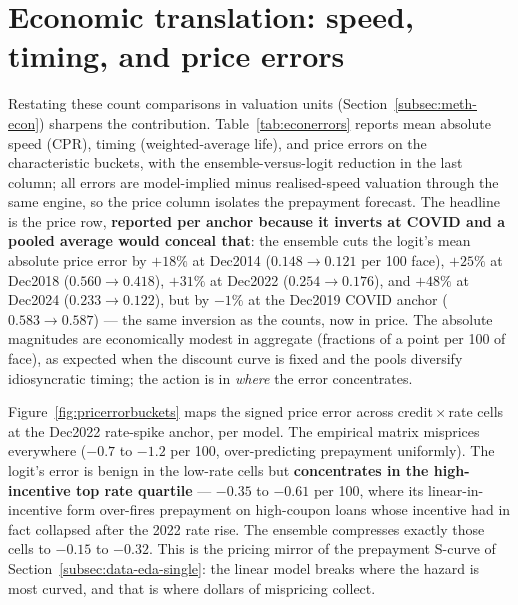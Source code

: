 \section{Economic translation: speed, timing, and price errors}

Restating these count comparisons in valuation units
(Section~\ref{subsec:meth-econ}) sharpens the contribution.
Table~\ref{tab:econerrors} reports mean absolute speed (CPR), timing
(weighted-average life), and price errors on the characteristic
buckets, with the ensemble-versus-logit reduction in the last column;
all errors are model-implied minus realised-speed valuation through the
same engine, so the price column isolates the prepayment forecast.  The
headline is the price row, \textbf{reported per anchor because it
inverts at COVID and a pooled average would conceal that}: the ensemble
cuts the logit's mean absolute price error by $+18\%$ at Dec2014
($0.148\to0.121$ per 100 face), $+25\%$ at Dec2018
($0.560\to0.418$), $+31\%$ at Dec2022 ($0.254\to0.176$), and $+48\%$ at
Dec2024 ($0.233\to0.122$), but by $-1\%$ at the Dec2019 COVID anchor
($0.583\to0.587$) --- the same inversion as the counts, now in price.
The absolute magnitudes are economically modest in aggregate (fractions
of a point per 100 of face), as expected when the discount curve is
fixed and the pools diversify idiosyncratic timing; the action is in
\emph{where} the error concentrates.

Figure~\ref{fig:pricerrorbuckets} maps the signed price error across
credit\,$\times$\,rate cells at the Dec2022 rate-spike anchor, per
model.  The empirical matrix misprices everywhere ($-0.7$ to $-1.2$ per
100, over-predicting prepayment uniformly).  The logit's error is
benign in the low-rate cells but \textbf{concentrates in the
high-incentive top rate quartile} --- $-0.35$ to $-0.61$ per 100, where
its linear-in-incentive form over-fires prepayment on high-coupon loans
whose incentive had in fact collapsed after the 2022 rate rise.  The
ensemble compresses exactly those cells to $-0.15$ to $-0.32$.  This is
the pricing mirror of the prepayment S-curve of
Section~\ref{subsec:data-eda-single}: the linear model breaks where the
hazard is most curved, and that is where dollars of mispricing collect.

\begin{table}[htbp]\centering\small
\caption[Pool CPR, weighted-average-life, and price errors by model and
anchor]{Mean absolute CPR (percentage points), weighted-average-life
(months), and price (per 100 face) error on the characteristic buckets,
by model and anchor, with the ensemble-versus-logit reduction.  Errors
are model-implied minus realised-speed valuation through the same
level-pay engine and discount curve.  The price row is the headline;
reported per anchor because the 2020 anchor
inverts.}\label{tab:econerrors}

\end{table}

